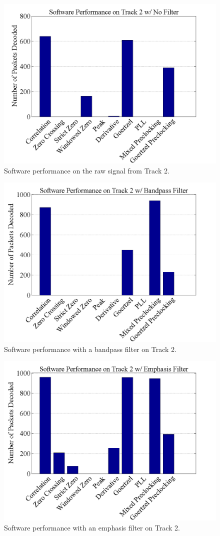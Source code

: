 \begin{figure}
  \centering
	\includegraphics[width=0.75\linewidth]{images/SoftwarePerformanceonTrack2wNoFilter.png} 
	\caption{Software performance on the raw signal from Track 2.}
   \label{T2FiltNo}
\end{figure}
\begin{figure}
  \centering
	\includegraphics[width=0.75\linewidth]{images/SoftwarePerformanceonTrack2wBandpassFilter.png} 
	\caption{Software performance with a bandpass filter on Track 2.}
   \label{T2Filt0}
\end{figure}
\begin{figure}
  \centering
	\includegraphics[width=0.75\linewidth]{images/SoftwarePerformanceonTrack2wEmphasisFilter.png} 
	\caption{Software performance with an emphasis filter on Track 2.}
   \label{T2Filt6}
\end{figure}


